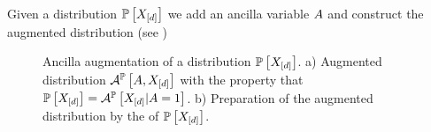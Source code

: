 Given a distribution $\mathbb{P}\left[X_{[d]}\right]$ we add an ancilla variable $A$ and construct the augmented distribution (see )

\begin{figure}
    \begin{center}
        
    \end{center}
    \caption{
        Ancilla augmentation of a distribution $\mathbb{P}\left[X_{[d]}\right]$.
        a) Augmented distribution $\mathcal{A}^{\mathbb{P}}\left[A,X_{[d]}\right]$ with the property that $\mathbb{P}\left[X_{[d]}\right] = \mathcal{A}^{\mathbb{P}}\left[X_{[d]}|A=1\right]$.
        b) Preparation of the augmented distribution by the \activationCircuit{} of $\mathbb{P}\left[X_{[d]}\right]$.
    }\label{fig:ancillaAugmentation}
\end{figure}


